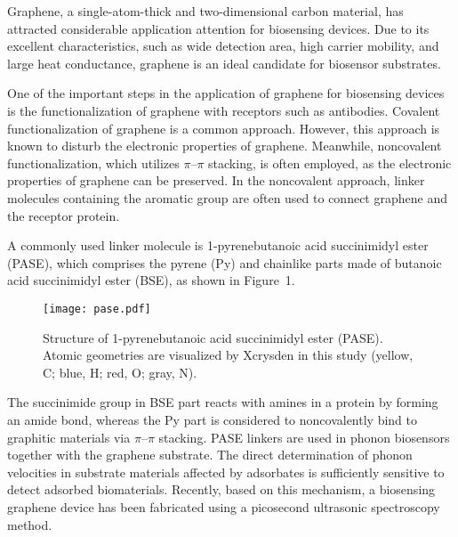 \documentclass[journal=acsodf,manuscript=article]{achemso}
\begin{document}
Graphene, a single-atom-thick and two-dimensional carbon material, has attracted considerable application attention for biosensing devices\cite{mohanty2008graphene,neto2009electronic,georgakilas2012functionalization,wang2011graphene,park2011enhanced,myung2011graphene,yang2010carbon}. Due to its excellent characteristics, such as wide detection area, high carrier mobility, and large heat conductance\cite{cite-key,novoselov2004electric}, graphene is an ideal candidate for biosensor substrates\cite{yang2010carbon}.

One of the important steps in the application of graphene for biosensing devices is the functionalization of graphene with receptors such as antibodies.
Covalent functionalization of graphene is a common approach\cite{loh2010chemistry}.
However, this approach is known to disturb the electronic properties of graphene\cite{georgakilas2012functionalization}.
Meanwhile, noncovalent functionalization, which utilizes $\pi$--$\pi$ stacking, is often employed, as the electronic properties of graphene can be preserved\cite{chen2001noncovalent,kodali2011nonperturbative,liu2012strategies}. 
In the noncovalent approach, linker molecules containing the aromatic group are often used to connect graphene and the receptor protein.

A commonly used linker molecule is 1-pyrenebutanoic acid succinimidyl ester (PASE), which comprises the pyrene (Py) and chainlike parts made of butanoic acid succinimidyl ester (BSE), as shown in Figure\ 1. 
\begin{figure}[t]
    \centering
     \texttt{[image: pase.pdf]}
    \caption{Structure of 1-pyrenebutanoic acid succinimidyl ester (PASE). Atomic geometries are visualized by Xcrysden\cite{kokalj1999xcrysden} in this study (yellow, C; blue, H; red, O; gray, N).}
\label{fig:pase}
\end{figure}
The succinimide group in BSE part reacts with amines in a protein by forming an amide bond, whereas the Py part is considered to noncovalently bind to graphitic materials via $\pi$--$\pi$ stacking\cite{katz1994application,jaegfeldt1983electrochemical,zhou2017label,7388878}. 
PASE linkers are used in phonon biosensors together with the graphene substrate. 
The direct determination of phonon velocities in substrate materials affected by adsorbates is sufficiently sensitive to detect adsorbed biomaterials. 
Recently, based on this mechanism, a biosensing graphene device has been fabricated using a picosecond ultrasonic spectroscopy method\cite{graphenebiosensor2021patent,graphenebiosensor2021proceedings}. 
\end{document}
